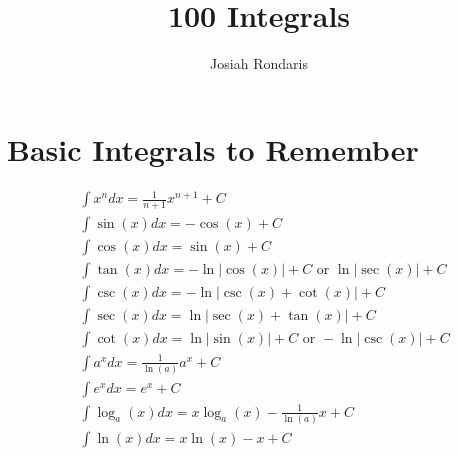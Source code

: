 \documentclass{article}
\title{100 Integrals}
\author{Josiah Rondaris}
\begin{document}
\maketitle
\section{Basic Integrals to Remember}
\begin{align*}
&\int x^ndx=\frac{1}{n+1}x^{n+1}+C \\
&\int\sin\left(x\right)dx=-\cos\left(x\right)+C \\
&\int\cos\left(x\right)dx=\sin\left(x\right)+C \\
&\int\tan\left(x\right)dx=-\ln\left|\cos\left(x\right)\right|+C\mbox{ or }\ln\left|\sec\left(x\right)\right|+C \\
&\int\csc\left(x\right)dx=-\ln\left|\csc\left(x\right)+\cot\left(x\right)\right|+C \\
&\int\sec\left(x\right)dx=\ln\left|\sec\left(x\right)+\tan\left(x\right)\right|+C \\
&\int\cot\left(x\right)dx=\ln\left|\sin\left(x\right)\right|+C\mbox{ or }-\ln\left|\csc\left(x\right)\right|+C \\
&\int a^xdx=\frac{1}{\ln\left(a\right)}a^x+C \\
&\int e^xdx=e^x+C \\
&\int\log_a\left(x\right)dx=x\log_a\left(x\right)-\frac{1}{\ln\left(a\right)}x+C \\
&\int\ln\left(x\right)dx=x\ln\left(x\right)-x+C
\end{align*}
\end{document}
